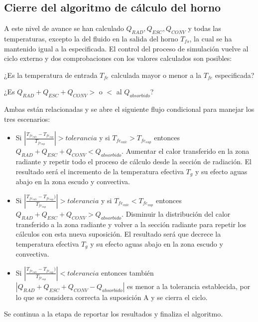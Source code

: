 \subsection{Cierre del algoritmo de cálculo del horno}
\par A este nivel de avance se han calculado $Q_{RAD}, Q_{ESC}, Q_{CONV}$ y todas las temperaturas, excepto la del fluido en la salida del horno $T_{fs}$, la cual se ha mantenido igual a la especificada. El control del proceso de simulación vuelve al ciclo externo y dos comprobaciones con los valores calculados son posibles:\\
\par ¿Es la temperatura de entrada $T_{fe}$ calculada mayor o menor a la $T_{fe}$ especificada?
\par ¿Es $Q_{RAD} + Q_{ESC} + Q_{CONV} >$ o $<$ al $Q_{absorbido}$?\\
\par Ambas están relacionadas y se abre el siguiente flujo condicional para manejar los tres escenarios:
\begin{itemize}
    \item Si $|\frac{T_{fe_{calc}} - T_{fe_{sup}}}{T_{fe_{sup}}} | > tolerancia$ y si $T_{fe_{calc}} > T_{fe_{sup}}$ entonces $Q_{RAD} + Q_{ESC} + Q_{CONV} < Q_{absorbido}$. Aumentar el calor transferido en la zona radiante y repetir todo el proceso de cálculo desde la sección de radiación. El resultado será el incremento de la temperatura efectiva $T_{g}$ y su efecto aguas abajo en la zona escudo y convectiva.
    \item Si $|\frac{T_{fe_{calc}} - T_{fe_{sup}})}{T_{fe_{sup}}} | > tolerancia$ y si $T_{fe_{calc}} < T_{fe_{sup}}$ entonces $Q_{RAD} + Q_{ESC} + Q_{CONV} > Q_{absorbido}$. Disminuir la distribución del calor transferido a la zona radiante y volver a la sección radiante para repetir los cálculos con esta nueva suposición. El resultado será que decrece la temperatura efectiva $T_{g}$ y su efecto aguas abajo en la zona escudo y convectiva.
    \item Si $|\frac{T_{fe_{calc}} - T_{fe_{sup}})}{T_{fe_{sup}}} | < tolerancia$ entonces también $|Q_{RAD} + Q_{ESC} + Q_{CONV} - Q_{absorbido}|$ es menor a la tolerancia establecida, por lo que se considera correcta la suposición A y se cierra el ciclo.
\end{itemize}
\par Se continua a la etapa de reportar los resultados y finaliza el algoritmo.